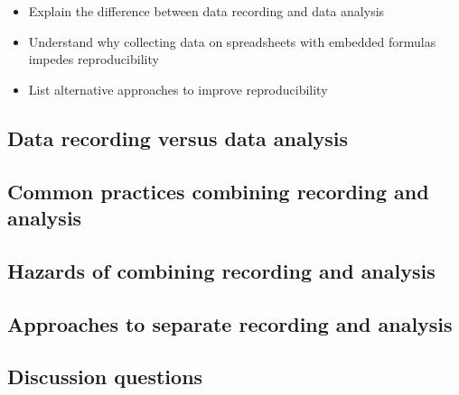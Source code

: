 \documentclass[]{tufte-book}
\providecommand{\tightlist}{%
  \setlength{\itemsep}{0pt}\setlength{\parskip}{0pt}}
\begin{document}
\begin{itemize}
\tightlist
\item
  Explain the difference between data recording and data analysis
\item
  Understand why collecting data on spreadsheets with embedded formulas impedes
  reproducibility
\item
  List alternative approaches to improve reproducibility
\end{itemize}

\hypertarget{data-recording-versus-data-analysis-16}{%
\subsection{Data recording versus data analysis}\label{data-recording-versus-data-analysis-16}}

\hypertarget{common-practices-combining-recording-and-analysis-16}{%
\subsection{Common practices combining recording and analysis}\label{common-practices-combining-recording-and-analysis-16}}

\hypertarget{hazards-of-combining-recording-and-analysis-16}{%
\subsection{Hazards of combining recording and analysis}\label{hazards-of-combining-recording-and-analysis-16}}

\hypertarget{approaches-to-separate-recording-and-analysis-16}{%
\subsection{Approaches to separate recording and analysis}\label{approaches-to-separate-recording-and-analysis-16}}

\hypertarget{discussion-questions-16}{%
\subsection{Discussion questions}\label{discussion-questions-16}}


\end{document}
